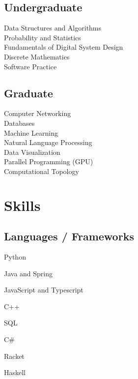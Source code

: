 \documentclass[letterpaper]{deedy-resume} %
\begin{document}
\begin{minipage}[t]{0.35\textwidth}
\subsection{Undergraduate}

Data Structures and Algorithms \\
Probability and Statistics \\
Fundamentals of Digital System Design \\
Discrete Mathematics \\
Software Practice \\

\subsection{Graduate}

Computer Networking \\
Databases \\
Machine Learning \\
Natural Language Processing \\
Data Visualization \\
Parallel Programming (GPU) \\
Computational Topology \\


\sectionspace %


\section{Skills}

\subsection{Languages / Frameworks}
\begin{tightitemize}
\vspace{\topsep} %
\item Python
\item Java and Spring
\item JavaScript and Typescript
\item C++
\item SQL
\item C\#
\item Racket
\item Haskell
\end{tightitemize}


\end{minipage}
\end{document}
